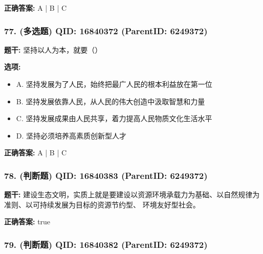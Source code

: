 \documentclass[12pt,UTF8]{ctexart}
\begin{document}
\textbf{正确答案:}
A | B | C

\vspace{0.3em}\hrulefill\vspace{0.7em}

\subsubsection*{77. (多选题) \small QID: 16840372 (ParentID: 6249372)}

\textbf{题干:}
坚持以人为本，就要（）



\textbf{选项:}
\begin{itemize}[leftmargin=*]

  \item A. 坚持发展为了人民，始终把最广人民的根本利益放在第一位

  \item B. 坚持发展依靠人民，从人民的伟大创造中汲取智慧和力量

  \item C. 坚持发展成果由人民共享，着力提高人民物质文化生活水平

  \item D. 坚持必须培养高素质创新型人才

\end{itemize}

\textbf{正确答案:}
A | B | C

\vspace{0.3em}\hrulefill\vspace{0.7em}

\subsubsection*{78. (判断题) \small QID: 16840383 (ParentID: 6249372)}

\textbf{题干:}
建设生态文明，实质上就是要建设以资源环境承载力为基础、以自然规律为准则、以可持续发展为目标的资源节约型、 环境友好型社会。



\textbf{正确答案:}
true

\vspace{0.3em}\hrulefill\vspace{0.7em}

\subsubsection*{79. (判断题) \small QID: 16840382 (ParentID: 6249372)}
\end{document}

